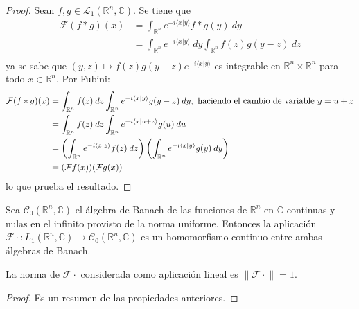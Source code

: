 \documentclass[12pt]{report}
\theoremstyle{largebreak}
\newcommand\cf[3]{\ensuremath{#1:#2\rightarrow#3}}
\newcommand\norm[1]{\ensuremath{\|#1\|}}
\newcommand\pint[2]{\ensuremath{\langle#1| #2\rangle}}
\newcommand{\fou}[1]{\ensuremath{\mathcal{F}#1}}
\begin{document}
    \begin{proof}
        Sean $f,g\in\mathcal{L}_1(\mathbb{R}^n,\mathbb{C})$. Se tiene que
        \begin{equation*}
            \begin{split}
                \fou{(f*g)}(x)&=\int_{\mathbb{R}^n}e^{ -i\pint{x}{y}}f*g(y)\:dy\\
                &=\int_{\mathbb{R}^n}e^{ -i\pint{x}{y}}\:dy\int_{\mathbb{R}^n}f(z)g(y-z)\:dz\\
            \end{split}
        \end{equation*}
        ya se sabe que $(y,z)\mapsto f(z)g(y-z)e^{ -i\pint{x}{y}}$ es integrable en $\mathbb{R}^n\times\mathbb{R}^n$ para todo $x\in\mathbb{R}^n$. Por Fubini:
        \begin{equation*}
            \begin{split}
                \fou{(f*g)}(x)&=\int_{\mathbb{R}^n}f(z)\:dz\int_{\mathbb{R}^n}e^{ -i\pint{x}{y}}g(y-z)\:dy,\textup{ haciendo el cambio de variable }y=u+z\\
                &=\int_{\mathbb{R}^n}f(z)\:dz\int_{\mathbb{R}^n}e^{-i\pint{x}{u+z}}g(u)\:du\\
                &=\left(\int_{\mathbb{R}^n}e^{ -i\pint{x}{z}}f(z)\:dz \right)\left(\int_{\mathbb{R}^n}e^{ -i\pint{x}{y}}g(y)\:dy \right)\\
                &=(\fou{f}(x))(\fou{g}(x))\\
            \end{split}
        \end{equation*}
        lo que prueba el resultado.
    \end{proof}

    \begin{theor}
        Sea $\mathcal{C}_0(\mathbb{R}^n,\mathbb{C})$ el álgebra de Banach de las funciones de $\mathbb{R}^n$ en $\mathbb{C}$ continuas y nulas en el infinito provisto de la norma uniforme. Entonces la aplicación $\cf{\fou{\cdot}}{L_1(\mathbb{R}^n,\mathbb{C})}{\mathcal{C}_0(\mathbb{R}^n,\mathbb{C})}$ es un homomorfismo continuo entre ambas álgebras de Banach.

        La norma de $\fou{\cdot}$ considerada como aplicación lineal es $\norm{\fou{\cdot}}=1$.
    \end{theor}

    \begin{proof}
        Es un resumen de las propiedades anteriores.
    \end{proof}
\end{document}

